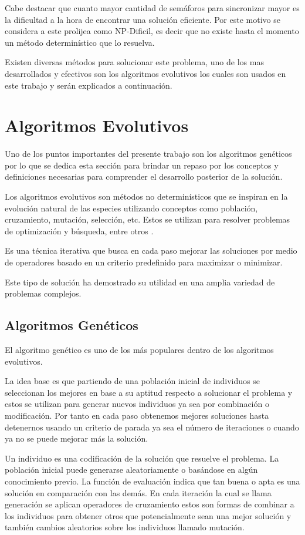 Cabe destacar que cuanto mayor cantidad de semáforos para sincronizar mayor es la dificultad a la hora de encontrar una solución eficiente. Por este motivo se considera a este prolijea como NP-Dificil, es decir que no existe hasta el momento un método determinístico que lo resuelva.


Existen diversas métodos para solucionar este problema, uno de los mas desarrollados y efectivos son los algoritmos evolutivos los cuales son usados en este trabajo y serán explicados a continuación.

\section{Algoritmos Evolutivos}

Uno de los puntos importantes del presente trabajo son los algoritmos genéticos por lo que se dedica esta sección para  brindar un repaso por los conceptos y definiciones necesarias para comprender el desarrollo posterior de la solución.

Los algoritmos evolutivos son métodos no determinísticos que se inspiran en la evolución natural de las especies utilizando conceptos como población, cruzamiento, mutación, selección, etc. Estos se utilizan para resolver problemas de optimización y búsqueda, entre otros \citep{Nesmachnow2002}.

Es una técnica iterativa que busca en cada paso mejorar las soluciones por medio de operadores basado en un criterio predefinido para maximizar o minimizar.

Este tipo de solución ha demostrado su utilidad en una amplia variedad de problemas complejos.


\subsection{Algoritmos Genéticos}
El algoritmo genético es uno de los más populares dentro de los algoritmos evolutivos.

La idea base es que partiendo de una población inicial de individuos se seleccionan los mejores en base a su aptitud respecto a solucionar el problema y estos se utilizan para generar nuevos individuos ya sea por combinación o modificación. Por tanto en cada paso obtenemos mejores soluciones hasta detenernos usando un criterio de parada ya sea el número de iteraciones o cuando ya no se puede mejorar más la solución.

Un individuo es una codificación de la solución que resuelve el problema.
La población inicial puede generarse aleatoriamente o basándose en algún conocimiento previo.
La función de evaluación indica que tan buena o apta es una solución en comparación con las demás.
En cada iteración la cual se llama generación se aplican operadores de cruzamiento estos son formas de combinar a los individuos para obtener otros que potencialmente sean una mejor solución y también cambios aleatorios sobre los individuos llamado mutación.

